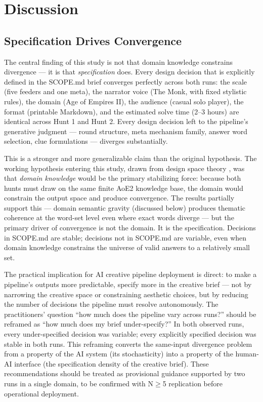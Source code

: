 \section{Discussion}

\subsection{Specification Drives Convergence}

The central finding of this study is not that domain knowledge constrains divergence --- it is that \textit{specification} does. Every design decision that is explicitly defined in the SCOPE.md brief converges perfectly across both runs: the scale (five feeders and one meta), the narrator voice (The Monk, with fixed stylistic rules), the domain (Age of Empires II), the audience (casual solo player), the format (printable Markdown), and the estimated solve time (2--3 hours) are identical across Hunt 1 and Hunt 2. Every design decision left to the pipeline's generative judgment --- round structure, meta mechanism family, answer word selection, clue formulations --- diverges substantially.

This is a stronger and more generalizable claim than the original hypothesis. The working hypothesis entering this study, drawn from design space theory \citep{simon1969sciences,lawson1997designers}, was that \textit{domain knowledge} would be the primary stabilizing force: because both hunts must draw on the same finite AoE2 knowledge base, the domain would constrain the output space and produce convergence. The results partially support this --- domain semantic gravity (discussed below) produces thematic coherence at the word-set level even where exact words diverge --- but the primary driver of convergence is not the domain. It is the specification. Decisions in SCOPE.md are stable; decisions not in SCOPE.md are variable, even when domain knowledge constrains the universe of valid answers to a relatively small set.

The practical implication for AI creative pipeline deployment is direct: to make a pipeline's outputs more predictable, specify more in the creative brief --- not by narrowing the creative space or constraining aesthetic choices, but by reducing the number of decisions the pipeline must resolve autonomously. The practitioners' question ``how much does the pipeline vary across runs?'' should be reframed as ``how much does my brief under-specify?'' In both observed runs, every under-specified decision was variable; every explicitly specified decision was stable in both runs. This reframing converts the same-input divergence problem from a property of the AI system (its stochasticity) into a property of the human-AI interface (the specification density of the creative brief). These recommendations should be treated as provisional guidance supported by two runs in a single domain, to be confirmed with N$\geq$5 replication before operational deployment.

